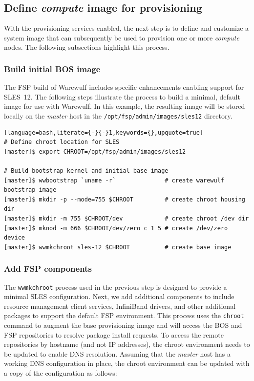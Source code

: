 \documentclass[letterpaper]{article}
\begin{document}
\subsection{Define {\em compute} image for provisioning}

With the provisioning services enabled, the next step is to define and
customize a system image that can subsequently be used to provision one or more
{\em compute} nodes. The following subsections highlight this process.

\subsubsection{Build initial BOS image}

The FSP build of Warewulf includes specific enhancements enabling support for
SLES~12. The following steps illustrate the process to build a minimal, default
image for use with Warewulf. In this example, the resulting image will be
stored locally on the {\em master} host in the
\texttt{/opt/fsp/admin/images/sles12} directory.

\begin{lstlisting}[language=bash,literate={-}{-}1,keywords={},upquote=true]
# Define chroot location for SLES 
[master]$ export CHROOT=/opt/fsp/admin/images/sles12

# Build bootstrap kernel and initial base image
[master]$ wwbootstrap `uname -r`              # create warewulf bootstrap image
[master]$ mkdir -p --mode=755 $CHROOT         # create chroot housing dir
[master]$ mkdir -m 755 $CHROOT/dev            # create chroot /dev dir
[master]$ mknod -m 666 $CHROOT/dev/zero c 1 5 # create /dev/zero device
[master]$ wwmkchroot sles-12 $CHROOT          # create base image

\end{lstlisting}

\subsubsection{Add FSP components}

The \texttt{wwmkchroot} process used in the previous step is designed to
provide a minimal SLES configuration. Next, we add additional components to
include resource management client services, InfiniBand drivers, and other
additional packages to support the default FSP environment.  This process uses
the \texttt{chroot} command to augment the base provisioning image and will
access the BOS and FSP repositories to resolve package install requests. To
access the remote repositories by hostname (and not IP addresses), the chroot
environment needs to be updated to enable DNS resolution. Assuming that
the {\em master} host has a working DNS configuration in place, the chroot environment can
be updated with a copy of the configuration as follows:
\end{document}
